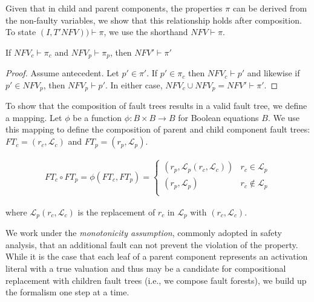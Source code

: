 Given that in child and parent components, the properties $\pi$ can be derived from the non-faulty variables, we show that this relationship holds after composition. To state $(I, T'\mathit{NFV})) \vdash \pi$, we use the shorthand $\mathit{NFV} \vdash \pi$. 

\begin{theorem} If $\mathit{NFV}_c \vdash \pi_c$ and $\mathit{NFV}_p \vdash \pi_p$, then $\mathit{NFV}' \vdash \pi'$
\begin{proof}
Assume antecedent. Let $p' \in \pi'$. If $p' \in \pi_c$ then $\mathit{NFV}_c \vdash p'$ and likewise if $p' \in \mathit{NFV}_p$, then $\mathit{NFV}_p \vdash p'$. In either case, $\mathit{NFV}_c \cup \mathit{NFV}_p = \mathit{NFV}' \vdash \pi'$.
\end{proof}
\end{theorem} 

To show that the composition of fault trees results in a valid fault tree, we define a mapping. Let $\phi$ be a function $\phi : B \times B \rightarrow B$ for Boolean equations $B$. We use this mapping to define the composition of parent and child component fault trees: $\mathit{FT}_c = (r_c, \mathcal{L}_c)$ and $\mathit{FT}_p = (r_p, \mathcal{L}_p)$.

\begin{gather}
\mathit{FT}_c \circ \mathit{FT}_p = \phi(\mathit{FT}_c, \mathit{FT}_p) =\begin{cases} 
      (r_p, \mathcal{L}_p(r_c, \mathcal{L}_c)) & r_c \in \mathcal{L}_p \\
      (r_p, \mathcal{L}_p) & r_c \not\in \mathcal{L}_p \\
   \end{cases}
\label{eq:phi}
\end{gather}

where $\mathcal{L}_p(r_c, \mathcal{L}_c)$ is the replacement of $r_c$ in $\mathcal{L}_p$ with $(r_c, \mathcal{L}_c)$.

We work under the {\em monotonicity assumption}, commonly adopted in safety analysis, that an additional fault can not prevent the violation of the property. While it is the case that each leaf of a parent component represents an activation literal with a true valuation and thus may be a candidate for compositional replacement with children fault trees (i.e., we compose fault forests), we build up the formalism one step at a time. 

